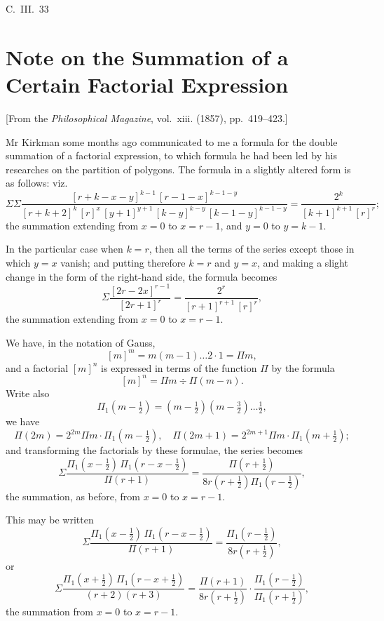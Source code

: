 \documentclass[11pt,a4paper]{book}
\begin{document}
\hfill C.~III.~33
\newpage


\section{Note on the Summation of a Certain Factorial Expression}
\label{sec:205}

[From the \textit{Philosophical Magazine}, vol.~xiii. (1857), pp.~419--423.]
\vspace{1em}

Mr Kirkman some months ago communicated to me a formula for the double summation of a factorial expression, to which formula he had been led by his researches on the partition of polygons. The formula in a slightly altered form is as follows: viz.
\[
\Sigma\Sigma \frac{[r+k-x-y]^{k-1}\,[r-1-x]^{k-1-y}}{[r+k+2]^{k}\,[r]^{x}\,[y+1]^{y+1}\,[k-y]^{k-y}\,[k-1-y]^{k-1-y}} = \frac{2^k}{[k+1]^{k+1}\,[r]^{r}};
\]
the summation extending from $x=0$ to $x=r-1$, and $y=0$ to $y=k-1$.

In the particular case when $k=r$, then all the terms of the series except those in which $y=x$ vanish; and putting therefore $k=r$ and $y=x$, and making a slight change in the form of the right-hand side, the formula becomes
\[
\Sigma \frac{[2r-2x]^{r-1}}{[2r+1]^{r}} = \frac{2^r}{[r+1]^{r+1}\,[r]^{r}},
\]
the summation extending from $x=0$ to $x=r-1$.

We have, in the notation of Gauss,
\[
[m]^m = m(m-1)\ldots 2 \cdot 1 = \Pi m,
\]
and a factorial $[m]^n$ is expressed in terms of the function $\Pi$ by the formula
\[
[m]^n = \Pi m \div \Pi(m-n).
\]
Write also
\[
\Pi_1(m - \tfrac{1}{2}) = (m - \tfrac{1}{2})(m - \tfrac{3}{2})\ldots \tfrac{1}{2},
\]
we have
\[
\Pi(2m) = 2^{2m} \Pi m \cdot \Pi_1(m - \tfrac{1}{2}), \quad \Pi(2m+1) = 2^{2m+1} \Pi m \cdot \Pi_1(m + \tfrac{1}{2});
\]
and transforming the factorials by these formulae, the series becomes
\[
\Sigma \frac{\Pi_1(x - \tfrac{1}{2})\,\Pi_1(r - x - \tfrac{1}{2})}{\Pi(r+1)} = \frac{\Pi(r + \tfrac{1}{2})}{8r(r + \tfrac{1}{2})\Pi_1(r - \tfrac{1}{2})},
\]
the summation, as before, from $x=0$ to $x=r-1$.

This may be written
\[
\Sigma \frac{\Pi_1(x - \tfrac{1}{2})\,\Pi_1(r - x - \tfrac{1}{2})}{\Pi(r+1)} = \frac{\Pi_1(r - \tfrac{1}{2})}{8r(r + \tfrac{1}{2})},
\]
or
\[
\Sigma \frac{\Pi_1(x + \tfrac{1}{2})\,\Pi_1(r - x + \tfrac{1}{2})}{(r+2)(r+3)} = \frac{\Pi(r+1)}{8r(r+\tfrac{1}{2})} \cdot \frac{\Pi_1(r - \tfrac{1}{2})}{\Pi_1(r + \tfrac{1}{2})},
\]
the summation from $x=0$ to $x=r-1$.
\end{document}

